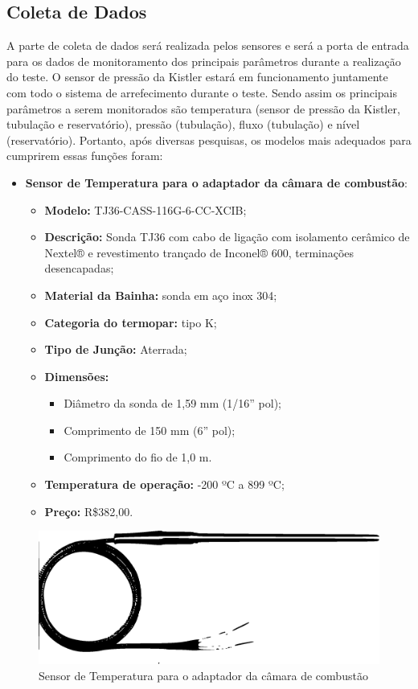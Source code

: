 \subsection{Coleta de Dados}
A parte de coleta de dados será realizada pelos sensores e será a porta de entrada para os dados de monitoramento dos principais parâmetros durante a realização do teste. O sensor de pressão da Kistler estará em funcionamento juntamente com todo o sistema de arrefecimento durante o teste. Sendo assim os principais parâmetros a serem monitorados são temperatura (sensor de pressão da Kistler, tubulação e reservatório), pressão (tubulação), fluxo (tubulação) e nível (reservatório). Portanto, após diversas pesquisas, os modelos mais adequados para cumprirem essas funções foram:
\begin{itemize}
	\item \textbf{Sensor de Temperatura para o adaptador da câmara de combustão}:
	\begin{itemize}
		\item \textbf{ Modelo:} TJ36-CASS-116G-6-CC-XCIB;
		\item \textbf{ Descrição:} Sonda TJ36 com cabo de ligação com isolamento cerâmico de Nextel® e revestimento trançado de Inconel® 600, terminações desencapadas;
		\item \textbf{ Material da Bainha:} sonda em aço inox 304;
		\item \textbf{ Categoria do termopar:} tipo K;
		\item \textbf{ Tipo de Junção:} Aterrada;
		\item \textbf{ Dimensões:}
		\begin{itemize}
			\item  Diâmetro da sonda de 1,59 mm (1/16” pol);
			\item Comprimento de 150 mm (6” pol);
			\item Comprimento do fio de 1,0 m.
		\end{itemize}
		\item \textbf{ Temperatura de operação:} -200 ºC a 899 ºC;
		\item \textbf{ Preço:} R\$382,00.
	\end{itemize}
	
\end{itemize}
\begin{figure}[!htb]                   
	\centering                          
	\includegraphics[scale=0.4]{figuras/Sensor1.eps}
	\caption{Sensor de Temperatura para o adaptador da câmara de combustão}               
\end{figure}

